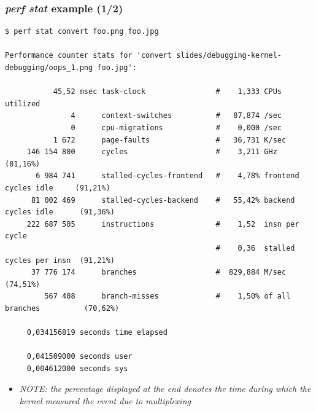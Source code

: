 \begin{frame}[fragile]
  \frametitle{{\em perf stat} example (1/2)}
  \begin{block}{}
    \begin{verbatim}
$ perf stat convert foo.png foo.jpg

Performance counter stats for 'convert slides/debugging-kernel-debugging/oops_1.png foo.jpg':

           45,52 msec task-clock                #    1,333 CPUs utilized          
               4      context-switches          #   87,874 /sec                   
               0      cpu-migrations            #    0,000 /sec                   
           1 672      page-faults               #   36,731 K/sec                  
     146 154 800      cycles                    #    3,211 GHz                      (81,16%)
       6 984 741      stalled-cycles-frontend   #    4,78% frontend cycles idle     (91,21%)
      81 002 469      stalled-cycles-backend    #   55,42% backend cycles idle      (91,36%)
     222 687 505      instructions              #    1,52  insn per cycle         
                                                #    0,36  stalled cycles per insn  (91,21%)
      37 776 174      branches                  #  829,884 M/sec                    (74,51%)
         567 408      branch-misses             #    1,50% of all branches          (70,62%)

     0,034156819 seconds time elapsed

     0,041509000 seconds user
     0,004612000 seconds sys
    \end{verbatim}
  \end{block}
  \begin{itemize}
    \item {\em NOTE: the percentage displayed at the end denotes the time
          during which the kernel measured the event due to multiplexing}
  \end{itemize}
\end{frame}

